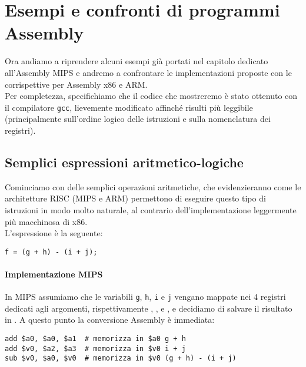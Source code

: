 \documentclass[class=book, crop=false, oneside]{standalone}
\begin{document}
\chapter{Esempi e confronti di programmi Assembly}
Ora andiamo a riprendere alcuni esempi già portati nel capitolo dedicato all'Assembly MIPS e andremo a confrontare le implementazioni proposte con le corrispettive per Assembly x86 e ARM.\\
Per completezza, specifichiamo che il codice che mostreremo è stato ottenuto con il compilatore \texttt{gcc}, lievemente modificato affinché risulti più leggibile (principalmente sull'ordine logico delle istruzioni e sulla nomenclatura dei registri).

\section{Semplici espressioni aritmetico-logiche}
Cominciamo con delle semplici operazioni aritmetiche, che evidenzieranno come le architetture RISC (MIPS e ARM) permettono di eseguire questo tipo di istruzioni in modo molto naturale, al contrario dell'implementazione leggermente più macchinosa di x86.\\
L'espressione è la seguente:
\begin{verbatim}
f = (g + h) - (i + j);
\end{verbatim}

\subsubsection{Implementazione MIPS}
In MIPS assumiamo che le variabili \texttt{g}, \texttt{h}, \texttt{i} e \texttt{j} vengano mappate nei 4 registri dedicati agli argomenti, rispettivamente , ,  e , e decidiamo di salvare il risultato in . A questo punto la conversione Assembly è immediata:
\begin{verbatim}
add $a0, $a0, $a1  # memorizza in $a0 g + h
add $v0, $a2, $a3  # memorizza in $v0 i + j
sub $v0, $a0, $v0  # memorizza in $v0 (g + h) - (i + j)
\end{verbatim}
\end{document}
